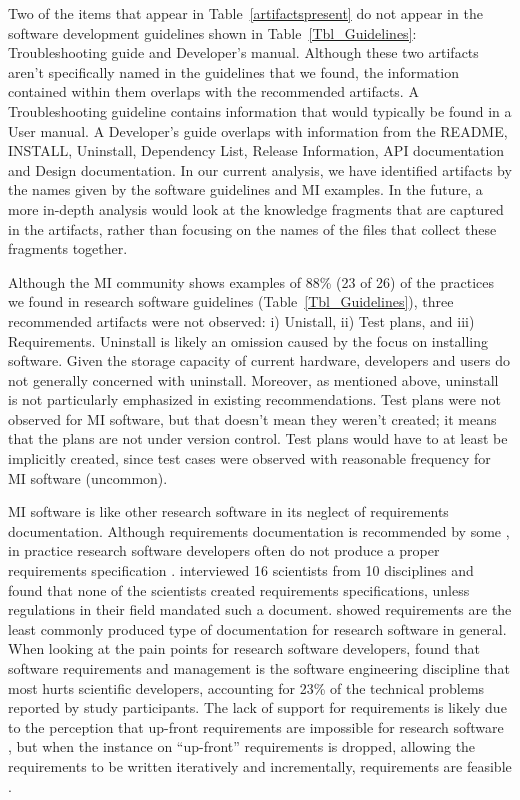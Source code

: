 \documentclass[final, 3p, times, authoryear]{elsarticle}
\begin{document}
Two of the items that appear in Table~\ref{artifactspresent} do not appear in
the software development guidelines shown in Table~\ref{Tbl_Guidelines}:
Troubleshooting guide and Developer's manual.  Although these two artifacts
aren't specifically named in the guidelines that we found, the information
contained within them overlaps with the recommended artifacts.  A
Troubleshooting guideline contains information that would typically be found in
a User manual.  A Developer's guide overlaps with information from the README,
INSTALL, Uninstall, Dependency List, Release Information, API documentation and
Design documentation.  In our current analysis, we have identified artifacts by
the names given by the software guidelines and MI examples.  In the future, a
more in-depth analysis would look at the knowledge fragments that are captured
in the artifacts, rather than focusing on the names of the files that collect
these fragments together.

Although the MI community shows examples of 88\% (23 of 26) of the practices we
found in research software guidelines (Table~\ref{Tbl_Guidelines}), three
recommended artifacts were not observed: i) Unistall, ii) Test plans, and iii)
Requirements.  Uninstall is likely an omission caused by the focus on installing
software. Given the storage capacity of current hardware, developers and users
do not generally concerned with uninstall. Moreover, as mentioned above,
uninstall is not particularly emphasized in existing recommendations.  Test
plans were not observed for MI software, but that doesn't mean they weren't
created; it means that the plans are not under version control.  Test plans
would have to at least be implicitly created, since test cases were observed
with reasonable frequency for MI software (uncommon).

MI software is like other research software in its neglect of requirements
documentation.  Although requirements documentation is recommended by some
\citep{TobiasEtAl2018, HerouxEtAl2008, SmithAndKoothoor2016}, in practice
research software developers often do not produce a proper requirements
specification \citep{HeatonAndCarver2015}. \citet{SandersAndKelly2008}
interviewed 16 scientists from 10 disciplines and found that none of the
scientists created requirements specifications, unless regulations in their
field mandated such a document. \citet{Nguyen-HoanEtAl2010} showed requirements
are the least commonly produced type of documentation for research software in
general. When looking at the pain points for research software developers,
\citet{WieseEtAl2019} found that software requirements and management is the
software engineering discipline that most hurts scientific developers,
accounting for 23\% of the technical problems reported by study participants.
The lack of support for requirements is likely due to the perception that
up-front requirements are impossible for research software
\citep{CarverEtAl2007,SegalAndMorris2008}, but when the instance on ``up-front''
requirements is dropped, allowing the requirements to be written iteratively and
incrementally, requirements are feasible \citep{Smith2016}.  
\end{document}
